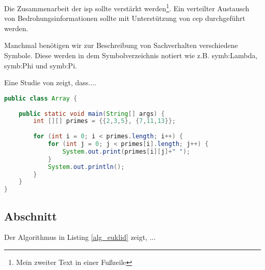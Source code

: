 \documentclass[twoside,12pt]{scrartcl}
\begin{document}
Die Zusammenarbeit der \gls{isp} sollte verstärkt werden\footnote{Mein zweiter Text in einer Fußzeile}. Ein verteilter Austausch von Bedrohungsinformationen sollte mit Unterstützung von \gls{cep} durchgeführt werden.


Manchmal benötigen wir zur Beschreibung von Sachverhalten verschiedene Symbole. Diese werden in dem Symbolverzeichnis notiert wie z.B. \gls{symb:Lambda}, \gls{symb:Phi} und \gls{symb:Pi}. 
\vspace{0.5cm}

Eine Studie von \citet{Hofstede2014} zeigt, dass....

\begin{lstlisting}[language=Java, caption={Matrix},label=alg_euklid,style=eclipse-java,moreemph={[2]out}]
public class Array {
	
	public static void main(String[] args) {
		int [][] primes = {{2,3,5}, {7,11,13}};
		
		for (int i = 0; i < primes.length; i++) {
			for (int j = 0; j < primes[i].length; j++) {
				System.out.print(primes[i][j]+" ");
			}
			System.out.println();
		}
	}
}
\end{lstlisting}

\subsection{Abschnitt}

	\blindtext
	
	\vspace{1cm}
	Der Algorithmus in Listing \ref{alg_euklid} zeigt, ...
		\vspace{1cm}
	
\end{document}
